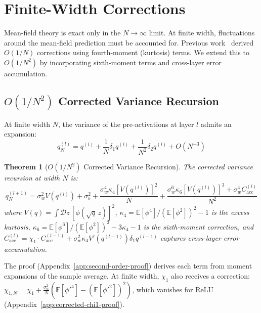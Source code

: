 \documentclass[10pt]{article}
\newcommand{\EE}{\mathbb{E}}
\newtheorem{theorem}{Theorem}
\begin{document}
\section{Finite-Width Corrections}
\label{sec:finite-width}

Mean-field theory is exact only in the $N \to \infty$ limit.
At finite width, fluctuations around the mean-field prediction must be accounted for.
Previous work~\cite{hanin2018neural} derived $O(1/N)$ corrections using fourth-moment (kurtosis) terms.
We extend this to $O(1/N^2)$ by incorporating sixth-moment terms and cross-layer error accumulation.

\subsection{$O(1/N^2)$ Corrected Variance Recursion}

At finite width $N$, the variance of the pre-activations at layer $l$ admits an expansion:
\begin{equation}
    q_N^{(l)} = q^{(l)} + \frac{1}{N} \delta_1 q^{(l)} + \frac{1}{N^2} \delta_2 q^{(l)} + O(N^{-3})
    \label{eq:finite-width-expansion}
\end{equation}

\begin{theorem}[$O(1/N^2)$ Corrected Variance Recursion]
\label{thm:second-order-correction}
The corrected variance recursion at width $N$ is:
\begin{equation}
    q^{(l+1)}_N = \sigma_w^2 V(q^{(l)}) + \sigma_b^2 + \frac{\sigma_w^4 \kappa_4 [V(q^{(l)})]^2}{N} + \frac{\sigma_w^6 \kappa_6 [V(q^{(l)})]^3 + \sigma_w^4 C_{\mathrm{acc}}^{(l)}}{N^2}
    \label{eq:second-order-correction}
\end{equation}
where $V(q) = \int \mathcal{D}z\, [\phi(\sqrt{q}\, z)]^2$, $\kappa_4 = \EE[\phi^4]/(\EE[\phi^2])^2 - 1$ is the excess kurtosis, $\kappa_6 = \EE[\phi^6]/(\EE[\phi^2])^3 - 3\kappa_4 - 1$ is the sixth-moment correction, and $C_{\mathrm{acc}}^{(l)} = \chi_1 \cdot C_{\mathrm{acc}}^{(l-1)} + \sigma_w^2 \kappa_4 V'(q^{(l-1)}) \delta_1 q^{(l-1)}$ captures cross-layer error accumulation.
\end{theorem}

The proof (Appendix~\ref{app:second-order-proof}) derives each term from moment expansions of the sample average.
At finite width, $\chi_1$ also receives a correction: $\chi_{1,N} = \chi_1 + \frac{\sigma_w^2}{N}(\EE[\phi'^4] - (\EE[\phi'^2])^2)$, which vanishes for ReLU (Appendix~\ref{app:corrected-chi1-proof}).
\end{document}
